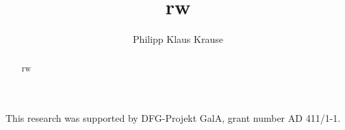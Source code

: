 \documentclass{acmsmall}
\begin{document}
\title{rw}

\author{Philipp Klaus Krause}

\begin{abstract}
rw
\end{abstract}



\begin{bottomstuff}
This research was supported by DFG-Projekt GalA, grant number AD 411/1-1.
\end{bottomstuff}

\maketitle



\end{document}
